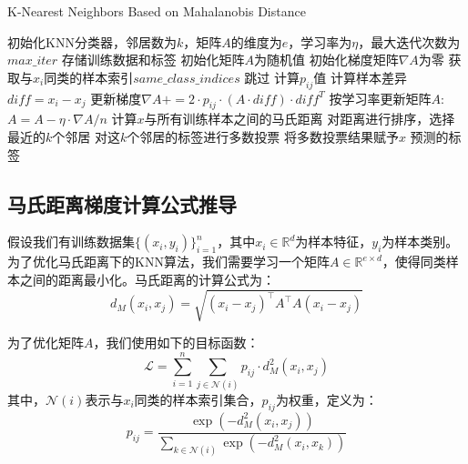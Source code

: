 \documentclass[12pt]{article}
\begin{document}
\begin{algorithm}
  \caption{K-Nearest Neighbors Based on Mahalanobis Distance}
  \label{K-Nearest Neighbors Based on Mahalanobis Distance}
  \begin{algorithmic}[1]
    \State 初始化KNN分类器，邻居数为$k$，矩阵$A$的维度为$e$，学习率为$\eta$，最大迭代次数为$max\_iter$
    \State 存储训练数据和标签
    \State 初始化矩阵$A$为随机值
    \State 初始化梯度矩阵$\nabla A$为零
    \State 获取与$x_i$同类的样本索引$same\_class\_indices$
    \State 跳过
    \EndIf
    \State 计算$p_{ij}$值
    \State 计算样本差异$diff = x_i - x_j$
    \State 更新梯度$\nabla A += 2 \cdot p_{ij} \cdot (A \cdot diff) \cdot diff^T$
    \EndFor
    \EndFor
    \State 按学习率更新矩阵$A$: $A = A - \eta \cdot \nabla A / n$
    \EndFor
    \EndProcedure
    \State 计算$x$与所有训练样本之间的马氏距离
    \State 对距离进行排序，选择最近的$k$个邻居
    \State 对这$k$个邻居的标签进行多数投票
    \State 将多数投票结果赋予$x$
    \EndFor
    \State \Return 预测的标签
    \EndProcedure
  \end{algorithmic}
\end{algorithm}

\subsection{马氏距离梯度计算公式推导}

假设我们有训练数据集$\{(x_i, y_i)\}_{i=1}^n$，其中$x_i \in \mathbb{R}^d$为样本特征，$y_i$为样本类别。为了优化马氏距离下的KNN算法，我们需要学习一个矩阵$A \in \mathbb{R}^{e \times d}$，使得同类样本之间的距离最小化。马氏距离的计算公式为：
\begin{equation}
  d_M(x_i, x_j) = \sqrt{(x_i - x_j)^\top A^\top A (x_i - x_j)}
\end{equation}

为了优化矩阵$A$，我们使用如下的目标函数：
\begin{equation}
  \mathcal{L} = \sum_{i=1}^n \sum_{j \in \mathcal{N}(i)} p_{ij} \cdot d_M^2(x_i, x_j)
\end{equation}
其中，$\mathcal{N}(i)$表示与$x_i$同类的样本索引集合，$p_{ij}$为权重，定义为：
\begin{equation}
  p_{ij} = \frac{\exp(-d_M^2(x_i, x_j))}{\sum_{k \in \mathcal{N}(i)} \exp(-d_M^2(x_i, x_k))}
\end{equation}
\end{document}
